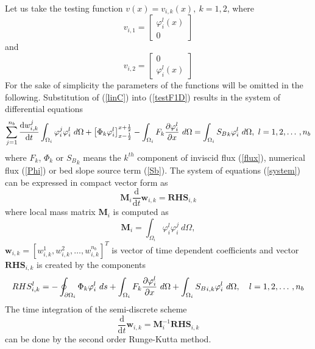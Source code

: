  Let us take the testing function $v(x)=v_{i,k}(x), \ k=1,2$, where
 \begin{equation}
  v_{i,1}=\begin{bmatrix}
  \varphi_i^l(x)\\
  0
  \end{bmatrix}
  \end{equation} 
  and
 \begin{equation}
  v_{i,2}=\begin{bmatrix}
0\\
  \varphi_i^l(x)
  \end{bmatrix}
  \end{equation}  
For the sake of simplicity the parameters of the functions will be omitted in the following. Substitution of (\ref{linC}) into (\ref{testF1D}) results in the system of differential equations\small
\begin{equation}\label{system}
\sum_{j=1}^{n_b} \frac{\text{d}w_{i,k}^j}{\text{d}t}   \int_{\Omega_i}\varphi^j_i \varphi^l_i  \ d\Omega +\left[ \Phi_k \varphi_i^l\right]_{x-\frac12}^{x+\frac12} -\int_{\Omega_i} F_k \parc{\varphi_i^l}{x} \ d\Omega=\int_{\Omega_i} {S_B}_k \varphi_i^l \ d\Omega,  \  l=1,2,\dotso, n_b
\end{equation}\normalsize
where $F_k$, $\Phi_k$ or ${S_B}_k$ means the $k^{th}$ component of inviscid flux (\ref{flux}), numerical flux (\ref{Phi}) or bed slope source term (\ref{Sb}). The system of equations (\ref{system}) can be expressed in compact vector form as
\begin{equation}\label{semi}
\mathbf{M}_i\frac{\text{d}}{\text{d}t}\mathbf{w}_{i,k}= \mathbf{RHS}_{i,k}
\end{equation}
where local mass matrix $\mathbf{M}_i$ is computed as
\begin{equation}
\mathbf{M}_i=\int_{\Omega_i} \varphi^l_i \varphi^j_i  \ d\Omega,
\end{equation}
 $\mathbf{w}_{i,k}=[w_{i,k}^1,w_{i,k}^2, \dotso, w_{i,k}^{n_b}]^T$ is vector of time dependent coefficients and   vector $\mathbf{RHS}_{i,k}$ is created by the components
\begin{equation}
RHS^l_{i,k}=-\oint_{\partial \Omega_i} \Phi_k \varphi_i^l \ 
ds+\int_{\Omega_i} F_k \parc{\varphi_i^l}{x} \ d\Omega+\int_{\Omega_i}{S_B}_{i,k} \varphi_i^l \ d\Omega, \quad l=1,2,\dotso, n_b
\end{equation}
The time integration of the semi-discrete scheme
\begin{equation}\label{semiB}
\frac{\text{d}}{\text{d}t}\mathbf{w}_{i,k}= \mathbf{M}_i^{-1}\mathbf{RHS}_{i,k}
\end{equation}
can be done by the second order Runge-Kutta method. 

